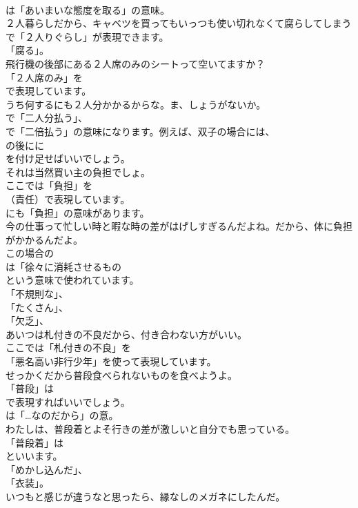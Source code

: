 \documentclass[8pt]{extreport}
\begin{document}
\begin{CJK}{UTF8}{min}
\\	は「あいまいな態度を取る」の意味。	
\\	２人暮らしだから、キャベツを買ってもいっつも使い切れなくて腐らしてしまう 
\\	で「２人りぐらし」が表現できます。
\\	「腐る」。	
\\	飛行機の後部にある２人席のみのシートって空いてますか？ 
\\	「２人席のみ」を
\\	で表現しています。	
\\	うち何するにも２人分かかるからな。ま、しょうがないか。 
\\	で「二人分払う」、
\\	で「二倍払う」の意味になります。例えば、双子の場合には、
\\	の後にに
\\	を付け足せばいいでしょう。	
\\	それは当然買い主の負担でしょ。 
\\	ここでは「負担」を 
\\	（責任）で表現しています。
\\	にも「負担」の意味があります。	
\\	今の仕事って忙しい時と暇な時の差がはげしすぎるんだよね。だから、体に負担がかかるんだよ。 
\\	この場合の
\\	は「徐々に消耗させるもの
\\	という意味で使われています。
\\	「不規則な」、
\\	「たくさん」、
\\	「欠乏」、
\\	あいつは札付きの不良だから、付き合わない方がいい。 
\\	ここでは「札付きの不良」を
\\	「悪名高い非行少年」を使って表現しています。	
\\	せっかくだから普段食べられないものを食べようよ。 
\\	「普段」は 
\\	で表現すればいいでしょう。
\\	は「…なのだから」の意。	
\\	わたしは、普段着とよそ行きの差が激しいと自分でも思っている。 
\\	「普段着」は
\\	といいます。
\\	「めかし込んだ」、
\\	「衣装」。	
\\	いつもと感じが違うなと思ったら、縁なしのメガネにしたんだ。 

\end{CJK}
\end{document}
